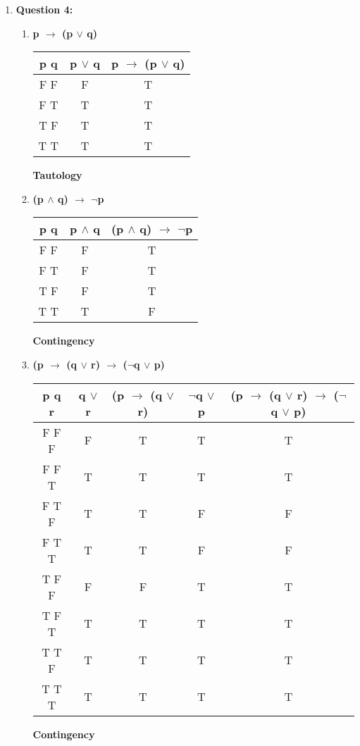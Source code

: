 \documentclass[11pt]{article}
\begin{document}
\begin{enumerate}
\item
\textbf{Question 4:} %
\begin{enumerate}[label=(\alph*)]
\item %
\textbf{p $\to$ (p $\lor$ q)} \\
    \begin{tabular}{c|c|c}
        \textbf{p q} & \textbf{p $\lor$ q} & \textbf{p $\to$ (p $\lor$ q)}\\
        \hline
        F F & F & T \\
        F T & T & T \\
        \hline
        T F & T & T \\
        T T & T & T \\
    \end{tabular}
\textbf{Tautology}\\

\item %
\textbf{(p $\land$ q) $\to$ $\lnot$p} \\
    \begin{tabular}{c|c|c}
        \textbf{p q} & \textbf{p $\land$ q} & \textbf{(p $\land$ q) $\to$ $\lnot$p} \\
        \hline
        F F & F & T \\
        F T & F & T \\
        \hline
        T F & F & T \\
        T T & T & F \\
    \end{tabular}
\textbf{Contingency}\\

\item %
\textbf{(p $\to$ (q $\lor$ r) $\to$ ($\lnot$q $\lor$ p)}\\
    \begin{tabular}{c|c|c|c|c}
        \textbf{p q r} & \textbf{q $\lor$ r} & \textbf{(p $\to$ (q $\lor$ r)} & \textbf{$\lnot$q $\lor$ p} & \textbf{(p $\to$ (q $\lor$ r) $\to$ ($\lnot$q $\lor$ p)} \\
        \hline
        F F F & F & T & T & T \\
        F F T & T & T & T & T \\
        \hline
        F T F & T & T & F & F \\
        F T T & T & T & F & F \\
        \hline
        T F F & F & F & T & T \\
        T F T & T & T & T & T \\
        \hline
        T T F & T & T & T & T \\
        T T T & T & T & T & T \\
    \end{tabular}
\textbf{Contingency}\\
\end{enumerate}


\end{enumerate}
\end{document}
